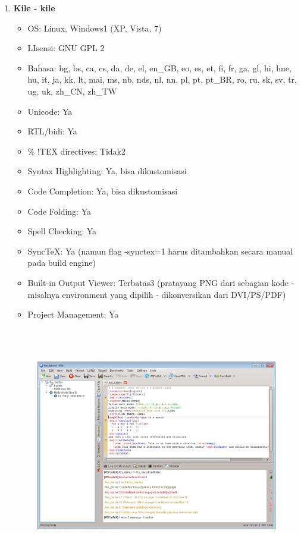 \documentclass[12pt,a4paper]{article}
\begin{document}
\begin{enumerate}
\item \textbf{Kile - kile}
\begin{itemize}
\item OS: Linux, Windows1 (XP, Vista, 7)
\item LIsensi: GNU GPL 2
\item Bahasa: bg, bs, ca, cs, da, de, el, en\_GB, eo, es, et, fi, fr, ga, gl, hi, hne, hu, it, ja, kk, lt, mai, ms, nb, nds, nl, nn, pl, pt, pt\_BR, ro, ru, sk, sv, tr, ug, uk, zh\_CN, zh\_TW
\item Unicode: Ya
\item RTL/bidi: Ya
\item \% !TEX directives: Tidak2
\item Syntax Highlighting: Ya, bisa dikustomisasi
\item Code Completion: Ya, bisa dikustomisasi
\item Code Folding: Ya
\item Spell Checking: Ya
\item SyncTeX: Ya (namun flag -synctex=1 harus ditambahkan secara manual pada build engine)
\item Built-in Output Viewer: Terbatas3 (pratayang PNG dari sebagian kode - misalnya environment yang dipilih - dikonversikan dari DVI/PS/PDF)
\item Project Management: Ya
\end{itemize}
\begin{figure}[ht]
\centering
\includegraphics[width=14.76cm,height=10.39cm]{gambar/image6.jpg}
\end{figure}



\end{enumerate}
\end{document}
